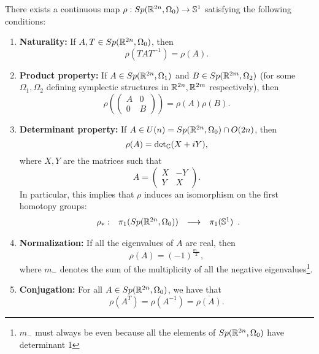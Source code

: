 \begin{theo}
There exists a continuous map $\rho : Sp(\mathbb{R}^{2n},\Omega_0) \rightarrow \mathbb{S}^1$ satisfying the following conditions:
\begin{enumerate}
	\item {\bf Naturality:} If $A,T \in Sp(\mathbb{R}^{2n},\Omega_0)$, then
	\[\rho(TAT^{-1}) = \rho(A) .\]
	\item {\bf Product property:} If $A \in Sp(\mathbb{R}^{2n},\Omega_1)$ and $B \in Sp(\mathbb{R}^{2m},\Omega_2)$ (for some $\Omega_1, \Omega_2$ defining symplectic structures in $\mathbb{R}^{2n}, \mathbb{R}^{2m}$ respectively), then
	\[\rho\left(\begin{pmatrix}A & 0 \\ 0 & B\end{pmatrix}\right) = \rho(A) \rho(B) .\]
	\item {\bf Determinant property:} If $A \in U(n) = Sp(\mathbb{R}^ {2n},\Omega_0) \cap O(2n)$, then
	\[\rho(A) = \text{det}_{\mathbb{C}}(X+iY),\]
	where $X,Y$ are the matrices such that
	\[A = \begin{pmatrix} X & -Y \\ Y & X \end{pmatrix}.\]
	In particular, this implies that $\rho$ induces an isomorphism on the first homotopy groups:
	\[\begin{array}{rccc} \rho_{\ast} : & \pi_1(Sp(\mathbb{R}^{2n},\Omega_0)) & \longrightarrow & \pi_1(\mathbb{S}^1) \end{array} .\]
	\item {\bf Normalization:} If all the eigenvalues of $A$ are real, then
	\[\rho(A) = (-1)^{\frac{m_{-}}2},\]
	where $m_{-}$ denotes the sum of the multiplicity of all the negative eigenvalues\footnote{$m_{-}$ must always be even because all the elements of $Sp(\mathbb{R}^{2n},\Omega_0)$ have determinant 1}.
	\item {\bf Conjugation:} For all $A \in Sp(\mathbb{R}^{2n},\Omega_0)$, we have that
	\[\rho(A^T) = \rho(A^{-1}) = \overline{\rho(A)} .\]
\end{enumerate}

\end{theo}
